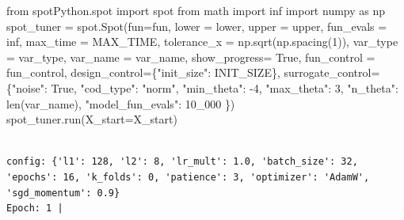 \documentclass[
  letterpaper,
  DIV=11,
  numbers=noendperiod]{scrreprt}
\newenvironment{Shaded}{\begin{snugshade}}{\end{snugshade}}
\newcommand{\BuiltInTok}[1]{\textcolor[rgb]{0.00,0.23,0.31}{#1}}
\newcommand{\DecValTok}[1]{\textcolor[rgb]{0.68,0.00,0.00}{#1}}
\newcommand{\ImportTok}[1]{\textcolor[rgb]{0.00,0.46,0.62}{#1}}
\newcommand{\NormalTok}[1]{\textcolor[rgb]{0.00,0.23,0.31}{#1}}
\newcommand{\OperatorTok}[1]{\textcolor[rgb]{0.37,0.37,0.37}{#1}}
\newcommand{\StringTok}[1]{\textcolor[rgb]{0.13,0.47,0.30}{#1}}
\newcommand{\VariableTok}[1]{\textcolor[rgb]{0.07,0.07,0.07}{#1}}
\begin{document}
\begin{Shaded}
\begin{Highlighting}[]
\ImportTok{from}\NormalTok{ spotPython.spot }\ImportTok{import}\NormalTok{ spot}
\ImportTok{from}\NormalTok{ math }\ImportTok{import}\NormalTok{ inf}
\ImportTok{import}\NormalTok{ numpy }\ImportTok{as}\NormalTok{ np}
\NormalTok{spot\_tuner }\OperatorTok{=}\NormalTok{ spot.Spot(fun}\OperatorTok{=}\NormalTok{fun,}
\NormalTok{                   lower }\OperatorTok{=}\NormalTok{ lower,}
\NormalTok{                   upper }\OperatorTok{=}\NormalTok{ upper,}
\NormalTok{                   fun\_evals }\OperatorTok{=}\NormalTok{ inf,}
\NormalTok{                   max\_time }\OperatorTok{=}\NormalTok{ MAX\_TIME,}
\NormalTok{                   tolerance\_x }\OperatorTok{=}\NormalTok{ np.sqrt(np.spacing(}\DecValTok{1}\NormalTok{)),}
\NormalTok{                   var\_type }\OperatorTok{=}\NormalTok{ var\_type,}
\NormalTok{                   var\_name }\OperatorTok{=}\NormalTok{ var\_name,}
\NormalTok{                   show\_progress}\OperatorTok{=} \VariableTok{True}\NormalTok{,}
\NormalTok{                   fun\_control }\OperatorTok{=}\NormalTok{ fun\_control,}
\NormalTok{                   design\_control}\OperatorTok{=}\NormalTok{\{}\StringTok{"init\_size"}\NormalTok{: INIT\_SIZE\},}
\NormalTok{                   surrogate\_control}\OperatorTok{=}\NormalTok{\{}\StringTok{"noise"}\NormalTok{: }\VariableTok{True}\NormalTok{,}
                                      \StringTok{"cod\_type"}\NormalTok{: }\StringTok{"norm"}\NormalTok{,}
                                      \StringTok{"min\_theta"}\NormalTok{: }\OperatorTok{{-}}\DecValTok{4}\NormalTok{,}
                                      \StringTok{"max\_theta"}\NormalTok{: }\DecValTok{3}\NormalTok{,}
                                      \StringTok{"n\_theta"}\NormalTok{: }\BuiltInTok{len}\NormalTok{(var\_name),}
                                      \StringTok{"model\_fun\_evals"}\NormalTok{: }\DecValTok{10\_000}
\NormalTok{                                      \})}
\NormalTok{spot\_tuner.run(X\_start}\OperatorTok{=}\NormalTok{X\_start)}
\end{Highlighting}
\end{Shaded}

\begin{verbatim}

config: {'l1': 128, 'l2': 8, 'lr_mult': 1.0, 'batch_size': 32, 'epochs': 16, 'k_folds': 0, 'patience': 3, 'optimizer': 'AdamW', 'sgd_momentum': 0.9}
Epoch: 1 | 
\end{verbatim}
\end{document}
